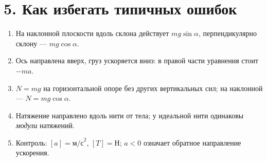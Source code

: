 \documentclass[a4paper,12pt]{article}
\newcommand{\mys}[1]{\section*{\textcolor{darkaccent}{#1}}\vspace{-7pt}\noindent{\color{accent}\rule{\linewidth}{0.4pt}}\par\vspace{2pt}}
\begin{document}
\mys{5. Как избегать типичных ошибок}
\begin{enumerate}
\item На наклонной плоскости вдоль склона действует $mg\sin\alpha$, перпендикулярно склону --- $mg\cos\alpha$.
\item Ось направлена вверх, груз ускоряется вниз: в правой части уравнения стоит $-ma$.
\item $N=mg$ на горизонтальной опоре без других вертикальных сил; на наклонной --- $N=mg\cos\alpha$.
\item Натяжение направлено вдоль нити от тела; у идеальной нити одинаковы \emph{модули} натяжений.
\item Контроль: $[a]=\text{м/с}^2$, $[T]=\text{Н}$; $a<0$ означает обратное направление ускорения.
\end{enumerate}
\end{document}
